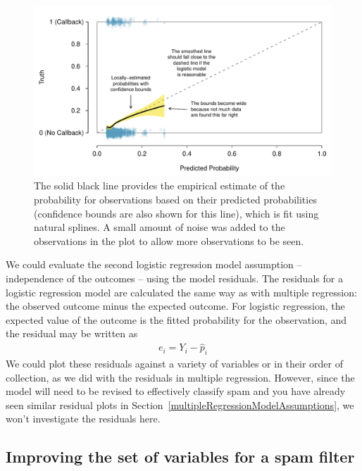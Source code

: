 \begin{figure}
\centering
\includegraphics[width=\textwidth]{ch_regr_mult_and_log/figures/logisticModel/logisticModelSpline}
\caption{The solid black line provides the empirical estimate of the probability for observations based on their predicted probabilities (confidence bounds are also shown for this line), which is fit using natural splines. A small amount of noise was added to the observations in the plot to allow more observations to be seen.}
\label{logisticModelSpline}
\end{figure}

We could evaluate the second logistic regression model assumption -- independence of the outcomes -- using the model residuals. The residuals for a logistic regression model are calculated the same way as with multiple regression: the observed outcome minus the expected outcome. For logistic regression, the expected value of the outcome is the fitted probability for the observation, and the residual may be written as
\begin{align*}
e_i = Y_i - \hat{p}_i
\end{align*}
We could plot these residuals against a variety of variables or in their order of collection, as we did with the residuals in multiple regression. However, since the model will need to be revised to effectively classify spam and you have already seen similar residual plots in Section~\ref{multipleRegressionModelAssumptions}, we won't investigate the residuals here.



\subsection{Improving the set of variables for a spam filter}
\label{improvingTheSetOfVariablesForASpamFilter}

